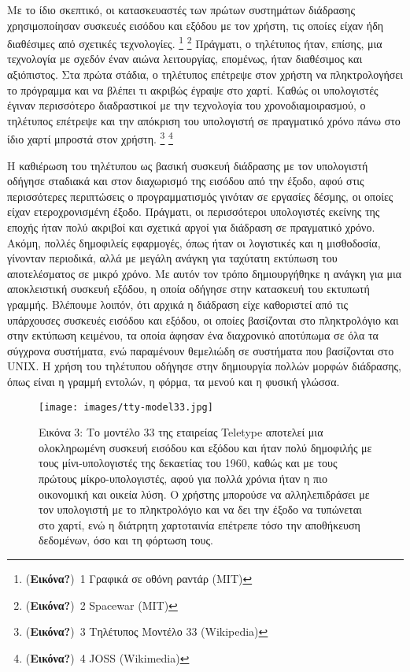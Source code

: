 \documentclass[
]{article}
\begin{document}
Με το ίδιο σκεπτικό, οι κατασκευαστές των πρώτων συστημάτων διάδρασης
χρησιμοποίησαν συσκευές εισόδου και εξόδου με τον χρήστη, τις οποίες
είχαν ήδη διαθέσιμες από σχετικές τεχνολογίες. \footnote{(\textbf{Εικόνα?})~1
  Γραφικά σε οθόνη ραντάρ (MIT)} \footnote{(\textbf{Εικόνα?})~2 Spacewar
  (MIT)} Πράγματι, ο τηλέτυπος ήταν, επίσης, μια τεχνολογία με σχεδόν
έναν αιώνα λειτουργίας, επομένως, ήταν διαθέσιμος και αξιόπιστος. Στα
πρώτα στάδια, ο τηλέτυπος επέτρεψε στον χρήστη να πληκτρολογήσει το
πρόγραμμα και να βλέπει τι ακριβώς έγραψε στο χαρτί. Καθώς οι
υπολογιστές έγιναν περισσότερο διαδραστικοί με την τεχνολογία του
χρονοδιαμοιρασμού, ο τηλέτυπος επέτρεψε και την απόκριση του υπολογιστή
σε πραγματικό χρόνο πάνω στο ίδιο χαρτί μπροστά στον χρήστη. \footnote{(\textbf{Εικόνα?})~3
  Τηλέτυπος Μοντέλο 33 (Wikipedia)} \footnote{(\textbf{Εικόνα?})~4 JOSS
  (Wikimedia)}

Η καθιέρωση του τηλέτυπου ως βασική συσκευή διάδρασης με τον υπολογιστή
οδήγησε σταδιακά και στον διαχωρισμό της εισόδου από την έξοδο, αφού
στις περισσότερες περιπτώσεις ο προγραμματισμός γινόταν σε εργασίες
δέσμης, οι οποίες είχαν ετεροχρονισμένη έξοδο. Πράγματι, οι περισσότεροι
υπολογιστές εκείνης της εποχής ήταν πολύ ακριβοί και σχετικά αργοί για
διάδραση σε πραγματικό χρόνο. Ακόμη, πολλές δημοφιλείς εφαρμογές, όπως
ήταν οι λογιστικές και η μισθοδοσία, γίνονταν περιοδικά, αλλά με μεγάλη
ανάγκη για ταχύτατη εκτύπωση του αποτελέσματος σε μικρό χρόνο. Με αυτόν
τον τρόπο δημιουργήθηκε η ανάγκη για μια αποκλειστική συσκευή εξόδου, η
οποία οδήγησε στην κατασκευή του εκτυπωτή γραμμής. Βλέπουμε λοιπόν, ότι
αρχικά η διάδραση είχε καθοριστεί από τις υπάρχουσες συσκευές εισόδου
και εξόδου, οι οποίες βασίζονται στο πληκτρολόγιο και στην εκτύπωση
κειμένου, τα οποία άφησαν ένα διαχρονικό αποτύπωμα σε όλα τα σύγχρονα
συστήματα, ενώ παραμένουν θεμελιώδη σε συστήματα που βασίζονται στο
UNIX. Η χρήση του τηλέτυπου οδήγησε στην δημιουργία πολλών μορφών
διάδρασης, όπως είναι η γραμμή εντολών, η φόρμα, τα μενού και η φυσική
γλώσσα.

\leavevmode{}%
\begin{figure}
\hypertarget{fig:tty-model33}{%
\centering
\texttt{[image: images/tty-model33.jpg]}
\caption{Εικόνα 3: Το μοντέλο 33 της εταιρείας Teletype αποτελεί μια
ολοκληρωμένη συσκευή εισόδου και εξόδου και ήταν πολύ δημοφιλής με τους
μίνι-υπολογιστές της δεκαετίας του 1960, καθώς και με τους πρώτους
μίκρο-υπολογιστές, αφού για πολλά χρόνια ήταν η πιο οικονομική και
οικεία λύση. Ο χρήστης μπορούσε να αλληλεπιδράσει με τον υπολογιστή με
το πληκτρολόγιο και να δει την έξοδο να τυπώνεται στο χαρτί, ενώ η
διάτρητη χαρτοταινία επέτρεπε τόσο την αποθήκευση δεδομένων, όσο και τη
φόρτωση τους.}\label{fig:tty-model33}
}
\end{figure}
\end{document}

